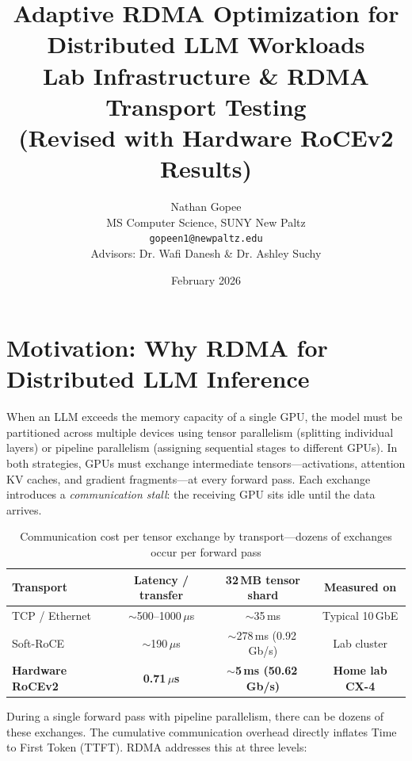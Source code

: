 \documentclass[10pt,letterpaper]{article}
\title{\textbf{Adaptive RDMA Optimization for Distributed LLM Workloads}\\[0.5em]
\large Lab Infrastructure \& RDMA Transport Testing\\[0.3em]
\normalsize (Revised with Hardware RoCEv2 Results)}
\author{Nathan Gopee\\
MS Computer Science, SUNY New Paltz\\
\texttt{gopeen1@newpaltz.edu}\\[1em]
\small Advisors: Dr. Wafi Danesh \& Dr. Ashley Suchy}
\date{February 2026}
\begin{document}
\maketitle

\section{Motivation: Why RDMA for Distributed LLM Inference}

When an LLM exceeds the memory capacity of a single GPU, the model must be partitioned across multiple devices using tensor parallelism (splitting individual layers) or pipeline parallelism (assigning sequential stages to different GPUs). In both strategies, GPUs must exchange intermediate tensors---activations, attention KV caches, and gradient fragments---at every forward pass. Each exchange introduces a \textit{communication stall}: the receiving GPU sits idle until the data arrives.

\begin{table}[H]
\centering
\small
\begin{tabular}{@{}lccc@{}}
\toprule
\textbf{Transport} & \textbf{Latency / transfer} & \textbf{32\,MB tensor shard} & \textbf{Measured on} \\
\midrule
TCP / Ethernet & $\sim$500--1000\,$\mu$s & $\sim$35\,ms & Typical 10\,GbE \\
Soft-RoCE & $\sim$190\,$\mu$s & $\sim$278\,ms (0.92\,Gb/s) & Lab cluster \\
\textbf{Hardware RoCEv2} & \textbf{0.71\,$\mu$s} & \textbf{$\sim$5\,ms (50.62\,Gb/s)} & \textbf{Home lab CX-4} \\
\bottomrule
\end{tabular}
\caption{Communication cost per tensor exchange by transport---dozens of exchanges occur per forward pass}
\end{table}

During a single forward pass with pipeline parallelism, there can be dozens of these exchanges. The cumulative communication overhead directly inflates Time to First Token (TTFT). RDMA addresses this at three levels:
\end{document}
